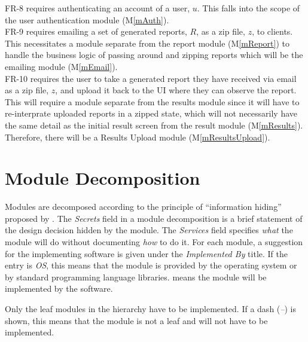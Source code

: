 \documentclass[12pt, titlepage]{article}
\newcommand{\mref}[1]{M\ref{#1}}
\begin{document}
FR-8 requires authenticating an account of a user, $u$. This falls into the scope of 
the user authentication module (\mref{mAuth}).\\

FR-9 requires emailing a set of generated reports, $R$, as a zip file, $z$, to clients.
This necessitates a module separate from the report module (\mref{mReport}) to handle the 
business logic of passing around and zipping reports which will be the emailing module
(\mref{mEmail}). \\

FR-10 requires the user to take a generated report they have received via email as a zip file,
$z$, and upload it back to the UI where they can observe the report. This will require a module 
separate from the results module since it will have to re-interprate uploaded reports in a 
zipped state, which will not necessarily have the same detail as the initial result screen
from the result module (\mref{mResults}). Therefore, there will be a Results Upload module
(\mref{mResultsUpload}). \\
  


\section{Module Decomposition} \label{SecMD}

Modules are decomposed according to the principle of ``information hiding''
proposed by \citet{ParnasEtAl1984}. The \emph{Secrets} field in a module
decomposition is a brief statement of the design decision hidden by the
module. The \emph{Services} field specifies \emph{what} the module will do
without documenting \emph{how} to do it. For each module, a suggestion for the
implementing software is given under the \emph{Implemented By} title. If the
entry is \emph{OS}, this means that the module is provided by the operating
system or by standard programming language libraries.  \emph{\progname{}} means the
module will be implemented by the \progname{} software.

Only the leaf modules in the hierarchy have to be implemented. If a dash
(\emph{--}) is shown, this means that the module is not a leaf and will not have
to be implemented.
\end{document}
